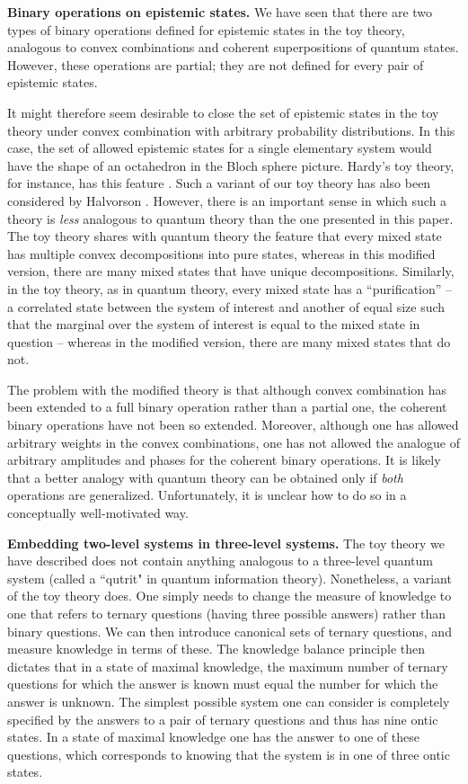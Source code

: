 \documentclass[pra,nofootinbib,showpacs,12pt]{revtex4}
\begin{document}
\textbf{Binary operations on epistemic states. }We have seen that there are
two types of binary operations defined for epistemic states in the toy
theory, analogous to convex combinations and coherent superpositions of
quantum states. However, these operations are partial; they are not defined
for every pair of epistemic states.

It might therefore seem desirable to close the set of epistemic states in
the toy theory under convex combination with arbitrary probability
distributions. In this case, the set of allowed epistemic states for a
single elementary system would have the shape of an octahedron in the Bloch
sphere picture. Hardy's toy theory, for instance, has this feature \cite%
{Hardydisentangling}. Such a variant of our toy theory has also
been considered by Halvorson \cite{Halvorson}. However, there is
an important sense in which such a theory is \emph{less} analogous
to quantum theory than the one presented in this paper. The toy
theory shares with quantum theory the feature that every mixed
state has multiple convex decompositions into pure states, whereas
in this modified version, there are many mixed states that have
unique decompositions. Similarly, in the toy theory, as in quantum
theory, every mixed state has a ``purification'' -- a correlated
state between the system of interest and another of equal size
such that the marginal over the system of interest is equal to the
mixed state in question -- whereas in the modified version, there
are many mixed states that do not.

The problem with the modified theory is that although convex
combination has been extended to a full binary operation rather
than a partial one, the coherent binary operations have not been
so extended. Moreover, although one has allowed arbitrary weights
in the convex combinations, one has not allowed the analogue of
arbitrary amplitudes and phases for the coherent binary
operations. It is likely that a better analogy with quantum theory
can be obtained only if \emph{both} operations are generalized.
Unfortunately, it is unclear how to do so in a conceptually
well-motivated way.

\textbf{Embedding two-level systems in three-level systems. }The
toy theory we have described does not contain anything analogous
to a three-level quantum system (called a ``qutrit" in quantum
information theory). Nonetheless, a variant of the toy theory
does. One simply needs to change the measure of knowledge to one
that refers to ternary questions (having three possible answers)
rather than binary questions. We can then introduce canonical sets
of ternary questions, and measure knowledge in terms of these. The
knowledge balance principle then dictates that in a state of
maximal knowledge, the maximum number of ternary questions for
which the answer is known must equal the number for which the
answer is unknown. The simplest possible system one can consider
is completely specified by the answers to a pair of ternary
questions and thus has nine ontic states. In a state of maximal
knowledge one has the answer to one of these questions, which
corresponds to knowing that the system is in one of three ontic
states.
\end{document}
